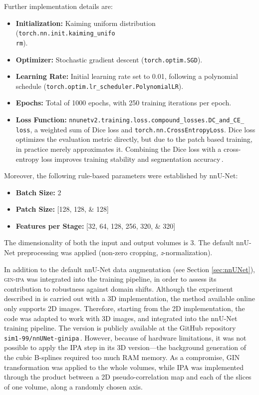Further implementation details are:
\begin{itemize}
    \item \textbf{Initialization:} Kaiming uniform distribution (\texttt{torch.nn.init.kaiming\_unifo\\
    rm}).
    \item \textbf{Optimizer:} Stochastic gradient descent (\texttt{torch.optim.SGD}).
    \item \textbf{Learning Rate:} Initial learning rate set to \num{0.01}, following a polynomial schedule (\texttt{torch.optim.lr\_scheduler.PolynomialLR}).
    \item \textbf{Epochs:} Total of \num{1000} epochs, with \num{250} training iterations per epoch.
    \item \textbf{Loss Function:} \texttt{nnunetv2.training.loss.compound\_losses.DC\_and\_CE\_\\
    loss}, a weighted sum of Dice loss and \texttt{torch.nn.CrossEntropyLoss}. Dice loss optimizes the evaluation metric directly, but due to the patch based training, in practice merely approximates it. Combining the Dice loss with a cross-entropy loss improves training stability and segmentation accuracy\,\cite{Isensee2021}.
\end{itemize}

Moreover, the following rule-based parameters were established by nnU-Net:
\begin{itemize}
    \item \textbf{Batch Size:} \num{2}
    \item \textbf{Patch Size:} [\numlist[list-final-separator = {, }]{128;128;128}]
    \item \textbf{Features per Stage:} [\numlist[list-final-separator = {, }]{32;64;128;256;320;320}]
\end{itemize}
The dimensionality of both the input and output volumes is \num{3}. The default nnU-Net preprocessing was applied (non-zero cropping, \textit{z}-normalization).

In addition to the default nnU-Net data augmentation (see Section \ref{sec:nnUNet}), \textsc{gin-ipa} was integrated into the training pipeline, in order to assess its contribution to robustness against domain shifts. Although the experiment described in \cite{Ouyang2023} is carried out with a 3D implementation, the method available online only supports 2D images. Therefore, starting from the 2D implementation, the code was adapted to work with 3D images, and integrated into the nnU-Net training pipeline. The version is publicly available at the GitHub repository \texttt{sim1-99/nnUNet-ginipa}\,\cite{nnUNet-ginipa}. However, because of hardware limitations, it was not possible to apply the IPA step in its 3D version---the background generation of the cubic B-splines required too much RAM memory. As a compromise, GIN transformation was applied to the whole volumes, while IPA was implemented through the product between a 2D pseudo-correlation map and each of the slices of one volume, along a randomly chosen axis.

